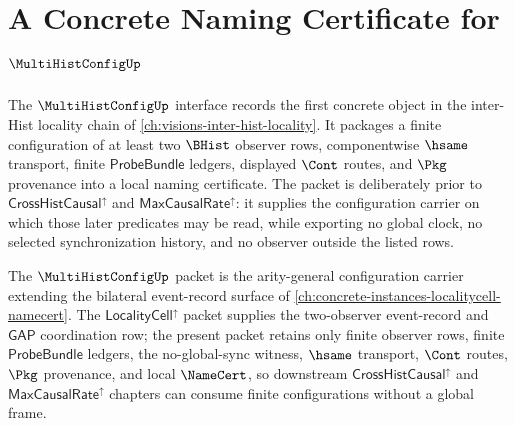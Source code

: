 \chapter{A Concrete Naming Certificate for $\MultiHistConfigUp$}
\label{ch:concrete-instances-multihistconfig-namecert}

The $\MultiHistConfigUp$ interface records the first concrete object in the inter-Hist locality chain of \autoref{ch:visions-inter-hist-locality}. It packages a finite configuration of at least two $\BHist$ observer rows, componentwise $\hsame$ transport, finite $\mathsf{ProbeBundle}$ ledgers, displayed $\Cont$ routes, and $\Pkg$ provenance into a local naming certificate. The packet is deliberately prior to $\mathsf{CrossHistCausal}^{\uparrow}$ and $\mathsf{MaxCausalRate}^{\uparrow}$: it supplies the configuration carrier on which those later predicates may be read, while exporting no global clock, no selected synchronization history, and no observer outside the listed rows.

The $\MultiHistConfigUp$ packet is the arity-general configuration carrier
extending the bilateral event-record surface of
\autoref{ch:concrete-instances-localitycell-namecert}. The
$\mathsf{LocalityCell}^{\uparrow}$ packet supplies the two-observer
event-record and $\mathsf{GAP}$ coordination row; the present packet retains
only finite observer rows, finite $\mathsf{ProbeBundle}$ ledgers, the
no-global-sync witness, $\hsame$ transport, $\Cont$ routes, $\Pkg$ provenance,
and local $\NameCert$, so downstream $\mathsf{CrossHistCausal}^{\uparrow}$ and
$\mathsf{MaxCausalRate}^{\uparrow}$ chapters can consume finite configurations
without a global frame.

